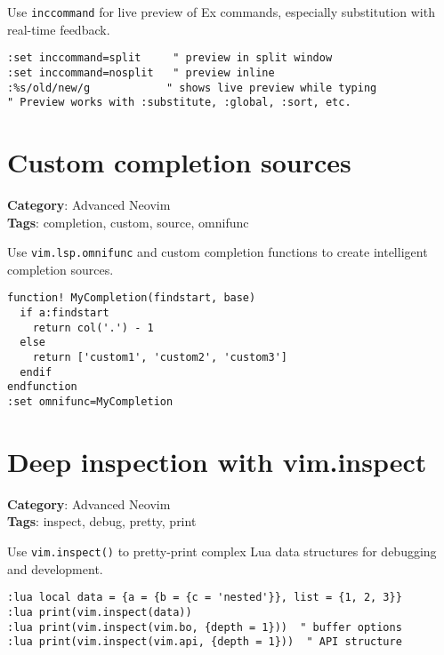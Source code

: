 Use {\footnotesize \Verb§inccommand§} for live preview of Ex commands, especially substitution with real-time feedback.

\begin{Exa*}{}
\begin{Verbatim}[fontsize=\footnotesize, breaklines, breakanywhere]
:set inccommand=split     " preview in split window
:set inccommand=nosplit   " preview inline
:%s/old/new/g            " shows live preview while typing
" Preview works with :substitute, :global, :sort, etc.
\end{Verbatim}
\end{Exa*}

\section{Custom completion sources}

\textbf{Category}: Advanced Neovim\\ \textbf{Tags}: completion, custom, source, omnifunc
\vspace{0.5cm}

Use {\footnotesize \Verb§vim.lsp.omnifunc§} and custom completion functions to create intelligent completion sources.

\begin{Exa*}{}
\begin{Verbatim}[fontsize=\footnotesize, breaklines, breakanywhere]
function! MyCompletion(findstart, base)
  if a:findstart
    return col('.') - 1
  else
    return ['custom1', 'custom2', 'custom3']
  endif
endfunction
:set omnifunc=MyCompletion
\end{Verbatim}
\end{Exa*}

\section{Deep inspection with vim.inspect}

\textbf{Category}: Advanced Neovim\\ \textbf{Tags}: inspect, debug, pretty, print
\vspace{0.5cm}

Use {\footnotesize \Verb§vim.inspect()§} to pretty-print complex Lua data structures for debugging and development.

\begin{Exa*}{}
\begin{Verbatim}[fontsize=\footnotesize, breaklines, breakanywhere]
:lua local data = {a = {b = {c = 'nested'}}, list = {1, 2, 3}}
:lua print(vim.inspect(data))
:lua print(vim.inspect(vim.bo, {depth = 1}))  " buffer options
:lua print(vim.inspect(vim.api, {depth = 1}))  " API structure
\end{Verbatim}
\end{Exa*}

